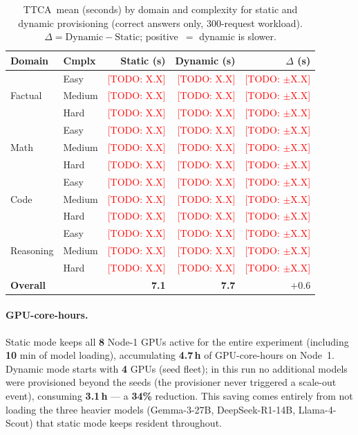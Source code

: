\documentclass[11pt]{article}
\newcommand{\ttca}{\textsc{TTCA}\xspace}
\newcommand{\result}[1]{\textbf{#1}}
\newcommand{\todo}[1]{\textcolor{red}{[TODO: #1]}}
\begin{document}
\begin{table}[t]
  \centering
  \caption{%
    \ttca\ mean (seconds) by domain and complexity for static and dynamic
    provisioning (correct answers only, 300-request workload).
    $\Delta = \text{Dynamic} - \text{Static}$; positive~$=$ dynamic is slower.%
  }
  \label{tab:ttca_breakdown}
  \small
  \begin{tabular}{llrrr}
    \toprule
    Domain & Cmplx & Static (s) & Dynamic (s) & $\Delta$ (s) \\
    \midrule
    \multirow{3}{*}{Factual}
      & Easy   & \todo{X.X} & \todo{X.X} & \todo{$\pm$X.X} \\
      & Medium & \todo{X.X} & \todo{X.X} & \todo{$\pm$X.X} \\
      & Hard   & \todo{X.X} & \todo{X.X} & \todo{$\pm$X.X} \\
    \midrule
    \multirow{3}{*}{Math}
      & Easy   & \todo{X.X} & \todo{X.X} & \todo{$\pm$X.X} \\
      & Medium & \todo{X.X} & \todo{X.X} & \todo{$\pm$X.X} \\
      & Hard   & \todo{X.X} & \todo{X.X} & \todo{$\pm$X.X} \\
    \midrule
    \multirow{3}{*}{Code}
      & Easy   & \todo{X.X} & \todo{X.X} & \todo{$\pm$X.X} \\
      & Medium & \todo{X.X} & \todo{X.X} & \todo{$\pm$X.X} \\
      & Hard   & \todo{X.X} & \todo{X.X} & \todo{$\pm$X.X} \\
    \midrule
    \multirow{3}{*}{Reasoning}
      & Easy   & \todo{X.X} & \todo{X.X} & \todo{$\pm$X.X} \\
      & Medium & \todo{X.X} & \todo{X.X} & \todo{$\pm$X.X} \\
      & Hard   & \todo{X.X} & \todo{X.X} & \todo{$\pm$X.X} \\
    \midrule
    \multicolumn{2}{l}{\textbf{Overall}}
      & \result{7.1} & \result{7.7} & \result{$+0.6$} \\
    \bottomrule
  \end{tabular}
\end{table}

\paragraph{GPU-core-hours.}
Static mode keeps all \result{8} Node-1 GPUs active for the entire
experiment (including \result{10} min of model loading),
accumulating \result{4.7\,h} of GPU-core-hours on Node~1.
Dynamic mode starts with \result{4} GPUs (seed fleet); in this run
no additional models were provisioned beyond the seeds
(the provisioner never triggered a scale-out event), consuming
\result{3.1\,h} — a \result{34\%} reduction.
This saving comes entirely from not loading the three heavier models
(Gemma-3-27B, DeepSeek-R1-14B, Llama-4-Scout) that static mode
keeps resident throughout.
\end{document}
